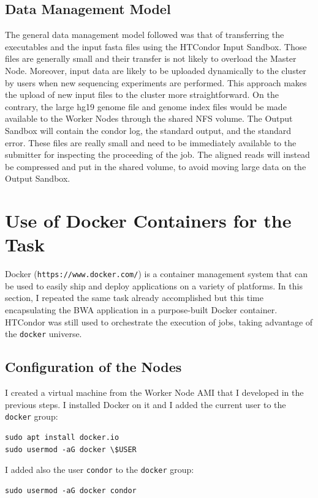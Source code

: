 \documentclass{article}
\begin{document}
\subsection{Data Management Model}
The general data management model followed was that of transferring the executables and the input fasta files using the HTCondor Input Sandbox.
Those files are generally small and their transfer is not likely to overload the Master Node.
Moreover, input data are likely to be uploaded dynamically to the cluster by users when new sequencing experiments are performed.
This approach makes the upload of new input files to the cluster more straightforward.
On the contrary, the large hg19 genome file and genome index files would be made available to the Worker Nodes through the shared NFS volume.
The Output Sandbox will contain the condor log, the standard output, and the standard error.
These files are really small and need to be immediately available to the submitter for inspecting the proceeding of the job.
The aligned reads will instead be compressed and put in the shared volume, to avoid moving large data on the Output Sandbox.

\section{Use of Docker Containers for the Task}
Docker (\texttt{https://www.docker.com/}) is a container management system that can be used to easily ship and deploy applications on a variety of platforms.
In this section, I repeated the same task already accomplished but this time encapsulating the BWA application in a purpose-built Docker container.
HTCondor was still used to orchestrate the execution of jobs, taking advantage of the \texttt{docker} universe.

\subsection{Configuration of the Nodes}
I created a virtual machine from the Worker Node AMI that I developed in the previous steps.
I installed Docker on it and I added the current user to the \texttt{docker} group:
\begin{lstlisting}
sudo apt install docker.io
sudo usermod -aG docker \$USER
\end{lstlisting}
I added also the user \texttt{condor} to the \texttt{docker} group:
\begin{lstlisting}
sudo usermod -aG docker condor
\end{lstlisting}
\end{document}
